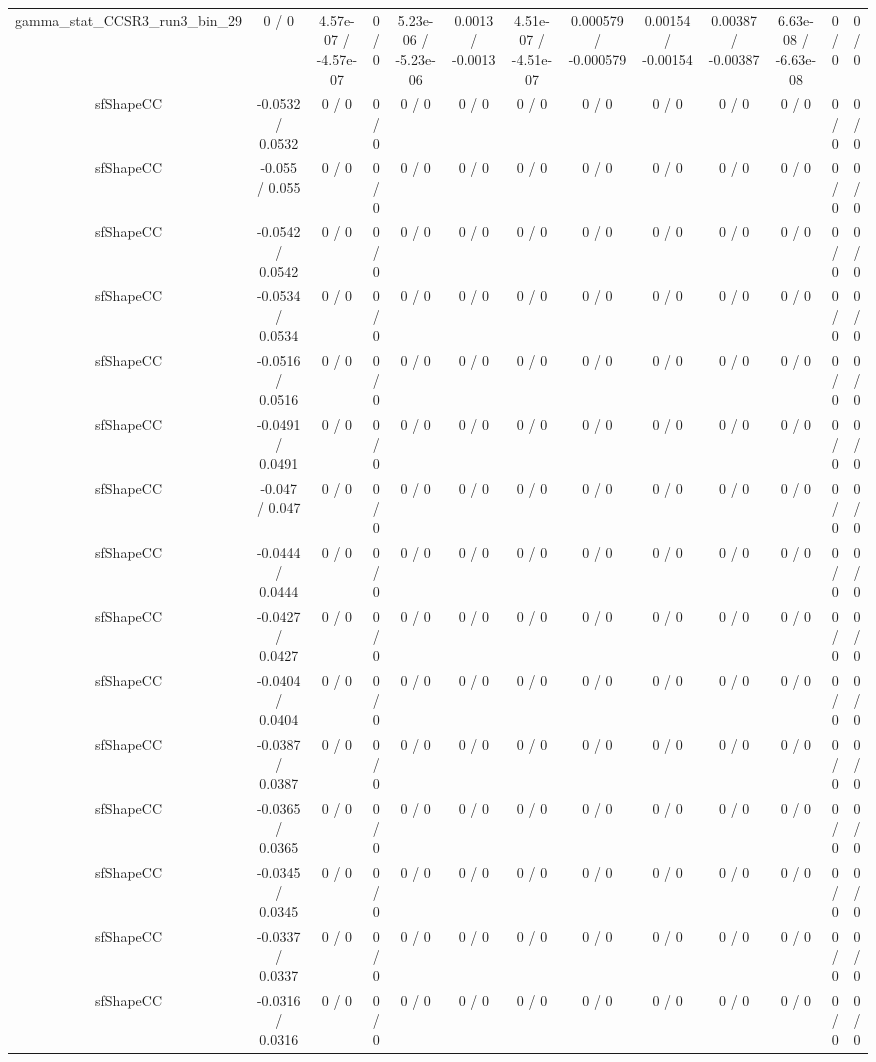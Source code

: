 \documentclass[10pt]{article}
\begin{document}
\begin{table}[htbp]
\begin{center}
\begin{tabular}{|c|c|c|c|c|c|c|c|c|c|c|c|c|}
  gamma_stat_CCSR3_run3_bin_29 & 0 / 0 & 4.57e-07 / -4.57e-07 & 0 / 0 & 5.23e-06 / -5.23e-06 & 0.0013 / -0.0013 & 4.51e-07 / -4.51e-07 & 0.000579 / -0.000579 & 0.00154 / -0.00154 & 0.00387 / -0.00387 & 6.63e-08 / -6.63e-08 & 0 / 0 & 0 / 0 \\ 
  sfShapeCC & -0.0532 / 0.0532 & 0 / 0 & 0 / 0 & 0 / 0 & 0 / 0 & 0 / 0 & 0 / 0 & 0 / 0 & 0 / 0 & 0 / 0 & 0 / 0 & 0 / 0 \\ 
  sfShapeCC & -0.055 / 0.055 & 0 / 0 & 0 / 0 & 0 / 0 & 0 / 0 & 0 / 0 & 0 / 0 & 0 / 0 & 0 / 0 & 0 / 0 & 0 / 0 & 0 / 0 \\ 
  sfShapeCC & -0.0542 / 0.0542 & 0 / 0 & 0 / 0 & 0 / 0 & 0 / 0 & 0 / 0 & 0 / 0 & 0 / 0 & 0 / 0 & 0 / 0 & 0 / 0 & 0 / 0 \\ 
  sfShapeCC & -0.0534 / 0.0534 & 0 / 0 & 0 / 0 & 0 / 0 & 0 / 0 & 0 / 0 & 0 / 0 & 0 / 0 & 0 / 0 & 0 / 0 & 0 / 0 & 0 / 0 \\ 
  sfShapeCC & -0.0516 / 0.0516 & 0 / 0 & 0 / 0 & 0 / 0 & 0 / 0 & 0 / 0 & 0 / 0 & 0 / 0 & 0 / 0 & 0 / 0 & 0 / 0 & 0 / 0 \\ 
  sfShapeCC & -0.0491 / 0.0491 & 0 / 0 & 0 / 0 & 0 / 0 & 0 / 0 & 0 / 0 & 0 / 0 & 0 / 0 & 0 / 0 & 0 / 0 & 0 / 0 & 0 / 0 \\ 
  sfShapeCC & -0.047 / 0.047 & 0 / 0 & 0 / 0 & 0 / 0 & 0 / 0 & 0 / 0 & 0 / 0 & 0 / 0 & 0 / 0 & 0 / 0 & 0 / 0 & 0 / 0 \\ 
  sfShapeCC & -0.0444 / 0.0444 & 0 / 0 & 0 / 0 & 0 / 0 & 0 / 0 & 0 / 0 & 0 / 0 & 0 / 0 & 0 / 0 & 0 / 0 & 0 / 0 & 0 / 0 \\ 
  sfShapeCC & -0.0427 / 0.0427 & 0 / 0 & 0 / 0 & 0 / 0 & 0 / 0 & 0 / 0 & 0 / 0 & 0 / 0 & 0 / 0 & 0 / 0 & 0 / 0 & 0 / 0 \\ 
  sfShapeCC & -0.0404 / 0.0404 & 0 / 0 & 0 / 0 & 0 / 0 & 0 / 0 & 0 / 0 & 0 / 0 & 0 / 0 & 0 / 0 & 0 / 0 & 0 / 0 & 0 / 0 \\ 
  sfShapeCC & -0.0387 / 0.0387 & 0 / 0 & 0 / 0 & 0 / 0 & 0 / 0 & 0 / 0 & 0 / 0 & 0 / 0 & 0 / 0 & 0 / 0 & 0 / 0 & 0 / 0 \\ 
  sfShapeCC & -0.0365 / 0.0365 & 0 / 0 & 0 / 0 & 0 / 0 & 0 / 0 & 0 / 0 & 0 / 0 & 0 / 0 & 0 / 0 & 0 / 0 & 0 / 0 & 0 / 0 \\ 
  sfShapeCC & -0.0345 / 0.0345 & 0 / 0 & 0 / 0 & 0 / 0 & 0 / 0 & 0 / 0 & 0 / 0 & 0 / 0 & 0 / 0 & 0 / 0 & 0 / 0 & 0 / 0 \\ 
  sfShapeCC & -0.0337 / 0.0337 & 0 / 0 & 0 / 0 & 0 / 0 & 0 / 0 & 0 / 0 & 0 / 0 & 0 / 0 & 0 / 0 & 0 / 0 & 0 / 0 & 0 / 0 \\ 
  sfShapeCC & -0.0316 / 0.0316 & 0 / 0 & 0 / 0 & 0 / 0 & 0 / 0 & 0 / 0 & 0 / 0 & 0 / 0 & 0 / 0 & 0 / 0 & 0 / 0 & 0 / 0 \\ 

\end{tabular}
\end{center}
\end{table}
\end{document}
